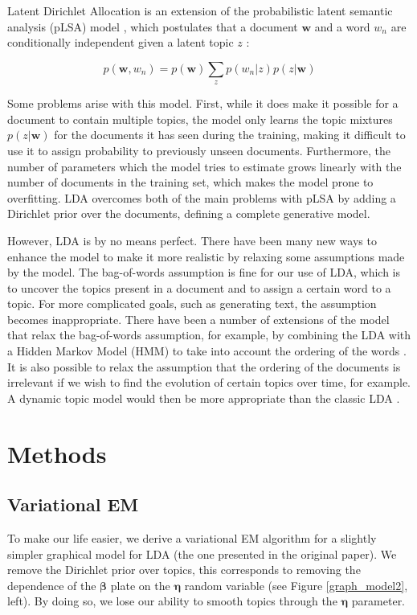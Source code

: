 \documentclass{article}
\begin{document}
Latent Dirichlet Allocation is an extension of the probabilistic latent semantic analysis (pLSA) model \cite{hofmann1999probabilistic}, which postulates that a document $\mathbf{w}$ and a word $w_{n}$ are conditionally independent given a latent topic $z$ :

\begin{equation*}
p(\mathbf{w},w_{n}) = p(\mathbf{w}) \sum_z p(w_n|z)p(z|\mathbf{w})
\end{equation*}

Some problems arise with this model. First, while it does make it possible for a document to contain multiple topics, the model only learns the topic mixtures $p(z|\mathbf{w})$ for the documents it has seen during the training, making it difficult to use it to assign probability to previously unseen documents. Furthermore, the number of parameters which the model tries to estimate grows linearly with the number of documents in the training set, which makes the model prone to overfitting. LDA overcomes both of the main problems with pLSA by adding a Dirichlet prior over the documents, defining a complete generative model.

However, LDA is by no means perfect. There have been many new ways to enhance the model to make it more realistic by relaxing some assumptions made by the model. The bag-of-words assumption is fine for our use of LDA, which is to uncover the topics present in a document and to assign a certain word to a topic. For more complicated goals, such as generating text, the assumption becomes inappropriate. There have been a number of extensions of the model that relax the bag-of-words assumption, for example, by combining the LDA with a Hidden Markov Model (HMM) to take into account the ordering of the words \cite{griffiths2005integrating}. It is also possible to relax the assumption that the ordering of the documents is irrelevant if we wish to find the evolution of certain topics over time, for example. A dynamic topic model would then be more appropriate than the classic LDA \cite{blei2006dynamic}.

\section{Methods}

\subsection{Variational EM}
To make our life easier, we derive a variational EM algorithm for a slightly simpler graphical model for LDA (the one presented in the original paper). We remove the Dirichlet prior over topics, this corresponds to removing the dependence of the $\bm{\beta}$ plate on the $\bm{\eta}$ random variable (see Figure \ref{graph_model2}, left). By doing so, we lose our ability to smooth topics through the $\bm{\eta}$ parameter.
\end{document}

